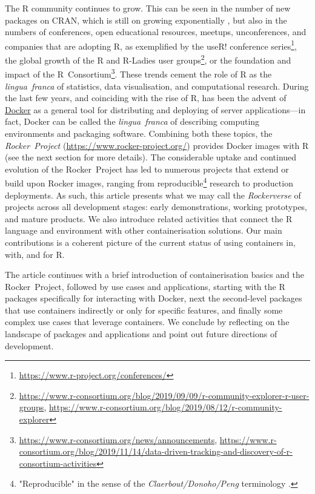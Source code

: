 The R community continues to grow. This can be seen in the number of new
packages on CRAN, which is still on growing exponentially
\citep{cran:2019}, but also in the numbers of conferences, open
educational resources, meetups, unconferences, and companies that are
adopting R, as exemplified by the useR! conference
series\footnote{\href{https://www.r-project.org/conferences/}{https://www.r-project.org/conferences/}},
the global growth of the R and R-Ladies user
groups\footnote{\href{https://www.r-consortium.org/blog/2019/09/09/r-community-explorer-r-user-groups}{https://www.r-consortium.org/blog/2019/09/09/r-community-explorer-r-user-groups}, \href{https://www.r-consortium.org/blog/2019/08/12/r-community-explorer}{https://www.r-consortium.org/blog/2019/08/12/r-community-explorer}},
or the foundation and impact of the
R~Consortium\footnote{\href{https://www.r-consortium.org/news/announcements}{https://www.r-consortium.org/news/announcements}, \href{https://www.r-consortium.org/blog/2019/11/14/data-driven-tracking-and-discovery-of-r-consortium-activities}{https://www.r-consortium.org/blog/2019/11/14/data-driven-tracking-and-discovery-of-r-consortium-activities}}.
These trends cement the role of R as the \emph{lingua~franca} of
statistics, data visualisation, and computational research. During the
last few years, and coinciding with the rise of R, has been the advent
of \href{https://en.wikipedia.org/wiki/Docker_(software)}{Docker} as a
general tool for distributing and deploying of server applications---in
fact, Docker can be called the \emph{lingua~franca} of describing
computing environments and packaging software. Combining both these
topics, the \emph{Rocker~Project}
(\url{https://www.rocker-project.org/}) provides Docker images with R
(see the next section for more details). The considerable uptake and
continued evolution of the Rocker~Project has led to numerous projects
that extend or build upon Rocker images, ranging from
reproducible\footnote{"Reproducible" in the sense of the \emph{Claerbout/Donoho/Peng} terminology \citep{barba_terminologies_2018}.}
research to production deployments. As such, this article presents what
we may call the \emph{Rockerverse} of projects across all development
stages: early demonstrations, working prototypes, and mature products.
We also introduce related activities that connect the R language and
environment with other containerisation solutions. Our main
contributions is a coherent picture of the current status of using
containers in, with, and for R.

The article continues with a brief introduction of containerisation
basics and the Rocker~Project, followed by use cases and applications,
starting with the R packages specifically for interacting with Docker,
next the second-level packages that use containers indirectly or only
for specific features, and finally some complex use cases that leverage
containers. We conclude by reflecting on the landscape of packages and
applications and point out future directions of development.

